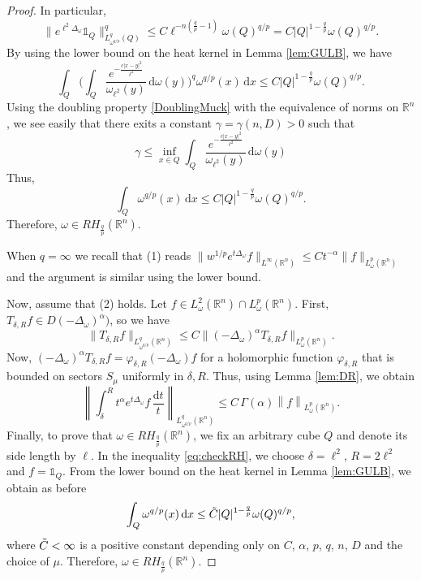 \documentclass[12pt, letterpaper]{amsart}
\theoremstyle{definition}
\theoremstyle{remark}
\numberwithin{equation}{section}
\begin{document}
{\begin{proof}
    In particular, 
    $$ \| e^{\ell^2\Delta_\omega} \mathbb{1}_Q \|^q_{L^q_{{\omega}^{q/p}}(Q)} \leq C \ell^{-n(\frac{q}{p}-1)} \omega(Q)^{q/p} = C |Q|^{1-\frac{q}{p}} \omega(Q)^{q/p}.$$
    By using the lower bound on the heat kernel in Lemma \ref{lem:GULB}, we have
    $$ \int_{Q} \bigg( \int_Q \frac{e^{-\frac{c|x-y|^2}{\ell^2}}}{\omega_{\ell^2}(y)} \, \mathrm d \omega(y)  \bigg)^q \omega^{q/p}(x) \, \mathrm d x \leq C |Q|^{1-\frac{q}{p}} \omega(Q)^{q/p}. $$
    Using the doubling property \eqref{DoublingMuck} with the equivalence of norms on $\mathbb{R}^n$, we see easily that there exits a constant $\gamma=\gamma(n,D)>0$ such that 
    $$ \gamma \leq \inf_{x\in Q} \int_Q \frac{e^{-\frac{c|x-y|^2}{\ell^2}}}{\omega_{\ell^2}(y)} \, \mathrm d \omega(y) $$
    Thus, $$  \int_{Q} \omega^{q/p}(x) \, \mathrm d x \leq C |Q|^{1-\frac{q}{p}} \omega(Q)^{q/p}. $$
    Therefore, $\omega \in RH_{\frac{q}{p}}(\mathbb{R}^n)$. 
    
    When $q=\infty$ we recall that (1) reads $\| w^{1/p}e^{t\Delta_\omega} f \|_{L^\infty(\mathbb{R}^n)} \leq C t^{-\alpha} \|  f \|_{L^p_{\omega}(\mathbb{R}^n)}$ and the argument is similar using the lower bound.

    
    Now, assume that (2) holds. Let $f\in L^2_\omega(\mathbb{R}^n) \cap L^p_\omega(\mathbb{R}^n)$.  First, $T_{\delta, R}f \in D(-\Delta_\omega)^{\alpha})$, so we have \begin{equation*}
        \| T_{\delta, R}f\|_{L^q_{{\omega}^{q/p}}(\mathbb{R}^n)} \leq C \| (-\Delta_\omega)^\alpha T_{\delta, R}f \|_{L^p_{\omega}(\mathbb{R}^n)}.
    \end{equation*}
   Now, $(-\Delta_\omega )^\alpha T_{\delta, R}f=\varphi_{\delta, R}(-\Delta_\omega )f$ for a holomorphic function $\varphi_{\delta, R}$ that is bounded on sectors $S_\mu$ uniformly in $\delta, R$. Thus, using Lemma \ref{lem:DR}, we obtain
    \begin{equation}\label{eq:checkRH}
        \left\| \int_{\delta}^{R}t^\alpha e^{t\Delta_\omega}f \, \frac{\mathrm{d}t}{t} \right\|_{L^q_{{\omega}^{q/p}}(\mathbb{R}^n)} \leq C \, \Gamma(\alpha)  \left\| f \right\|_{L^p_{\omega}(\mathbb{R}^n)}.
    \end{equation}
    Finally, to prove that $\omega \in RH_{\frac{q}{p}}(\mathbb{R}^n)$, we fix an arbitrary cube $Q$ and denote its side length by $\ell$. In the inequality \eqref{eq:checkRH}, we choose $\delta=\ell^2$, $R=2\ell^2$ and $f=\mathbb{1}_Q$. From the lower bound on the heat kernel in Lemma \ref{lem:GULB}, we  obtain as before
    $$  \int_{Q} \omega^{q/p}(x) \, \mathrm d x \leq \Tilde{C} |Q|^{1-\frac{q}{p}} \omega(Q)^{q/p}, $$
    where $\Tilde{C}<\infty$ is a positive constant depending only on $C$, $\alpha$, $p$, $q$, $n$, $D$ and the choice of $\mu$. Therefore, $\omega \in RH_{\frac{q}{p}}(\mathbb{R}^n)$.
\end{proof}


}
\end{document}
